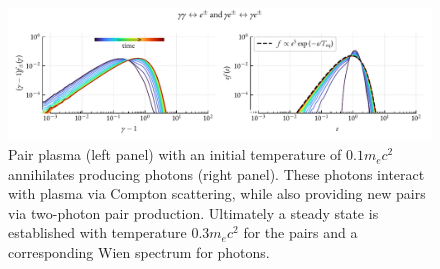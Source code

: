 \begin{figure}[htb]
    \includegraphics[width=\textwidth]{figures/ch1-numerics/fig_svensson.pdf}
    \caption{Pair plasma (left panel) with an initial temperature of $0.1 m_e c^2$ annihilates producing photons (right panel). These photons interact with plasma via Compton scattering, while also providing new pairs via two-photon pair production. Ultimately a steady state is established with temperature $0.3 m_e c^2$ for the pairs and a corresponding Wien spectrum for photons.}
    \label{fig:num-svensson}
\end{figure}

